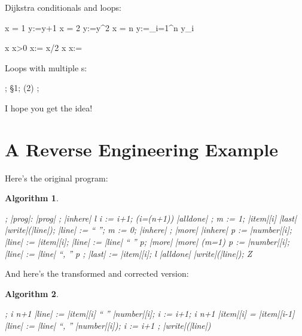 \documentclass{article}
\newtheorem{algorithm}{Algorithm}[section]
\begin{document}
\noindent Dijkstra conditionals and loops:
\begin{program}
\IF x = 1 \AR y:=y+1
\BAR x = 2 \AR y:=y^2
\utdots
\BAR x = n \AR y:=\displaystyle\sum_{i=1}^n y_i \FI

 \origbar x \AND x>0 \AR x:= x/2
\BAR {} \origbar x    \AR x:=  \OD
\end{program}

\noindent Loops with multiple s:
\begin{program} 
\DO \DO \IF {} \THEN \EXIT \FI;
	\S1;
	\IF {} \THEN \EXIT(2) \FI \OD;
    \IF {} \THEN \EXIT \FI \OD
\end{program} 

\noindent I hope you get the idea!

\section{A Reverse Engineering Example}

Here's the original program:
\begin{algorithm}
\begin{program} 
 \VAR {}; 
 \ACTIONS |prog|: 
|prog| \ACTIONEQ %
    ;
    \CALL |inhere| \ENDACTION
l \ACTIONEQ %
    i := i+1; 
    \IF (i=(n+1)) \THEN \CALL |alldone| \FI ; 
    m := 1; 
    \IF |item|[i] \neq |last|
	\THEN |write|(|line|); |line| := `` ''; m := 0;
	      \CALL |inhere| \FI ; 
    \CALL |more| \ENDACTION
|inhere| \ACTIONEQ %
    p := |number|[i]; |line| := |item|[i];
    |line| := |line| \concat `` '' \concat p;
    \CALL |more| \ENDACTION
|more| \ACTIONEQ %
    \IF (m=1) \THEN p := |number|[i];
    |line| := |line| \concat ``, '' \concat p \FI ; 
    |last| := |item|[i]; 
    \CALL l  \ENDACTION  
|alldone| \ACTIONEQ |write|(|line|); \CALL Z \ENDACTION \ENDACTIONS \END 
\end{program} 
\end{algorithm}

And here's the transformed and corrected version:
\begin{algorithm}
\begin{program} 
;
\WHILE i \neq n+1 \DO 
  |line| := |item|[i] \concat `` '' \concat |number|[i]; 
  i := i+1; 
  \WHILE i \neq n+1 \AND |item|[i] = |item|[i-1] \DO 
    |line| := |line| \concat ``, '' \concat |number|[i]);
    i := i+1 \OD ; 
  |write|(|line|) \OD 
\end{program}
\end{algorithm}
\end{document}
